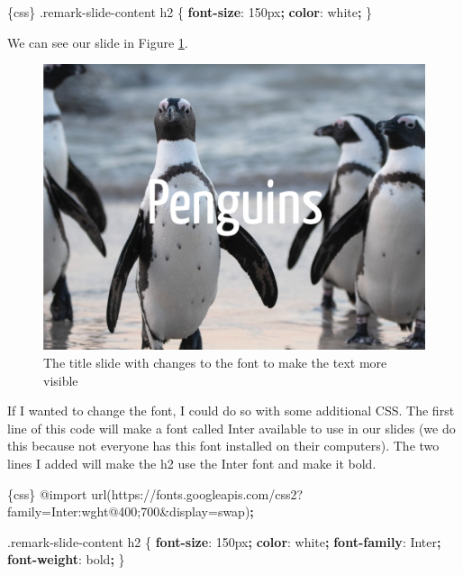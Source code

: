 \documentclass[
]{book}
\newenvironment{Shaded}{\begin{snugshade}}{\end{snugshade}}
\newcommand{\ConstantTok}[1]{\textcolor[rgb]{0.00,0.00,0.00}{#1}}
\newcommand{\DataTypeTok}[1]{\textcolor[rgb]{0.13,0.29,0.53}{#1}}
\newcommand{\DecValTok}[1]{\textcolor[rgb]{0.00,0.00,0.81}{#1}}
\newcommand{\FunctionTok}[1]{\textcolor[rgb]{0.00,0.00,0.00}{#1}}
\newcommand{\ImportTok}[1]{#1}
\newcommand{\KeywordTok}[1]{\textcolor[rgb]{0.13,0.29,0.53}{\textbf{#1}}}
\newcommand{\NormalTok}[1]{#1}
\newcommand{\OperatorTok}[1]{\textcolor[rgb]{0.81,0.36,0.00}{\textbf{#1}}}
\newcommand{\StringTok}[1]{\textcolor[rgb]{0.31,0.60,0.02}{#1}}
\begin{document}
\begin{Shaded}
\begin{Highlighting}[]
\NormalTok{\textasciigrave{}\textasciigrave{}\textasciigrave{}\{css\}}
\FunctionTok{.remark{-}slide{-}content}\NormalTok{ h2 \{}
  \KeywordTok{font{-}size}\NormalTok{: }\DecValTok{150}\DataTypeTok{px}\OperatorTok{;}
  \KeywordTok{color}\NormalTok{: }\ConstantTok{white}\OperatorTok{;}
\NormalTok{\}}
\NormalTok{\textasciigrave{}\textasciigrave{}\textasciigrave{}}
\end{Highlighting}
\end{Shaded}

We can see our slide in Figure \ref{fig:penguins-report}.

\begin{figure}
\includegraphics[width=1\linewidth]{assets/penguins-report} \caption{The title slide with changes to the font to make the text more visible}\label{fig:penguins-report}
\end{figure}

If I wanted to change the font, I could do so with some additional CSS. The first line of this code will make a font called Inter available to use in our slides (we do this because not everyone has this font installed on their computers). The two lines I added will make the h2 use the Inter font and make it bold.

\begin{Shaded}
\begin{Highlighting}[]
\NormalTok{\textasciigrave{}\textasciigrave{}\textasciigrave{}\{css\}}
\ImportTok{@import} \FunctionTok{url(}\StringTok{\textquotesingle{}https://fonts.googleapis.com/css2?family=Inter:wght@400;700\&display=swap\textquotesingle{}}\FunctionTok{)}\OperatorTok{;}

\FunctionTok{.remark{-}slide{-}content}\NormalTok{ h2 \{}
  \KeywordTok{font{-}size}\NormalTok{: }\DecValTok{150}\DataTypeTok{px}\OperatorTok{;}
  \KeywordTok{color}\NormalTok{: }\ConstantTok{white}\OperatorTok{;}
    \KeywordTok{font{-}family}\NormalTok{: Inter}\OperatorTok{;}
  \KeywordTok{font{-}weight}\NormalTok{: }\DecValTok{bold}\OperatorTok{;}
\NormalTok{\}}
\NormalTok{\textasciigrave{}\textasciigrave{}\textasciigrave{}}
\end{Highlighting}
\end{Shaded}
\end{document}
